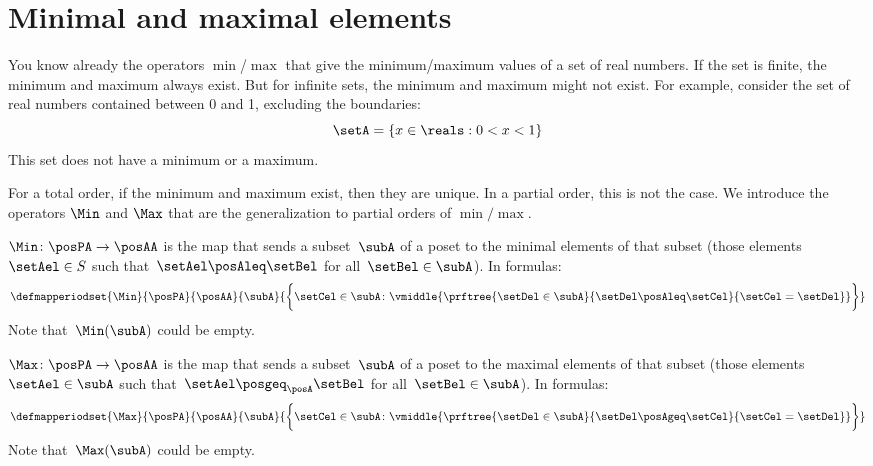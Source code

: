 \section{Minimal and maximal elements}

You know already the operators $\min$/$\max$ that give the minimum/maximum values of a set of real numbers.
If the set is finite, the minimum and maximum always exist.
But for infinite sets, the minimum and maximum might not exist.
For example, consider the set of real numbers contained between 0 and 1, excluding the boundaries:
\begin{equation}
	\setA = \{ x \in \reals  : 0 < x < 1 \}
\end{equation}
This set does not have a minimum or a maximum.

For a total order, if the minimum and maximum exist, then they are unique.
In a partial order, this is not the case.
We introduce the operators $\Min$ and $\Max$ that are the generalization to partial orders of $\min/\max$.

\begin{ctdefinition}
	\label{def:Min}
	$\Min \colon \posPA \to \posAA$ is the map that sends a subset~$\subA$ of a poset to the minimal elements of that subset (those elements~$\setAel \in S$ such that~$\setAel \posAleq \setBel$ for all~$\setBel \in \subA$).
	In formulas:
	\begin{equation*}
		\defmapperiodset{\Min}{\posPA}{\posAA}{\subA}{\bigg\{
			\setCel\in \subA\colon
			\vmiddle{
				\prftree{
					\setDel\in \subA
				}{
					\setDel\posAleq \setCel
				}{
					\setCel=\setDel
				}
			}
			\bigg\}}
	\end{equation*}
	Note that~$\Min(\subA)$ could be empty.
\end{ctdefinition}

\begin{ctdefinition}
	\label{def:Max}
	$\Max \colon \posPA \to \posAA$ is the map that sends a subset~$\subA$ of a poset to the maximal elements of that subset (those elements~$\setAel \in \subA$ such that~$\setAel \posgeq_\posA \setBel$ for all~$\setBel \in \subA$).
	In formulas:
	\begin{equation*}
		\defmapperiodset{
			\Max
		}{
			\posPA
		}{
			\posAA
		}{
			\subA
		}{
			\bigg\{
			\setCel\in \subA\colon
			\vmiddle{
				\prftree{
					\setDel\in \subA
				}{
					\setDel\posAgeq \setCel
				}{
					\setCel=\setDel
				}
			}
			\bigg\}
		}
	\end{equation*}
	Note that~$\Max(\subA)$ could be empty.
\end{ctdefinition}

